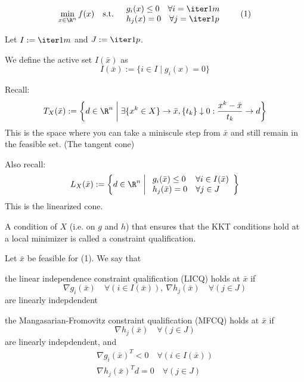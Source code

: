 \label{befc1f5}
\begin{equation}
	\min_{x\in\R^n} f(x)\quad\text{s.t.}\quad\begin{array}{l}
		g_i(x)\leq0 \quad\forall i=\iter1m \\
		h_j(x)=0    \quad\forall j=\iter1p
	\end{array}
	\tag*{(1)}
\end{equation}

Let $I:=\iter1m$ and $J:=\iter1p$.

We define the active set $I(\bar x)$ as
$$
	I(\bar x):=\{i\in I\mid g_i(x) = 0\}
$$

Recall:
$$
	T_X(\bar x):=\left\{
	d\in\R^n \;\middle\vert\; \exists \{x^k\in X\}\to\bar x,\{t_k\}\downarrow0:\frac{x^k-\bar x}{t_k}\to d
	\right\}
$$
This is the space where you can take a miniscule step from $\bar x$
and still remain in the feasible set. (The tangent cone)

Also recall:
$$
	L_X(\bar x):=\left\{
	d\in\R^n
	\;\middle\vert\;
	\begin{array}{l l}
		g_i(\bar x)\leq0 & \forall i\in I(\bar x) \\
		h_j(\bar x)=0    & \forall j\in J
	\end{array}
	\right\}
$$
This is the linearized cone.

\label{e8fa554}

A condition of $X$ (i.e. on $g$ and $h$) that ensures that the KKT
conditions hold at a local minimizer is called a constraint
qualification.

\label{fed784a}

Let $\bar x$ be feasible for (1). We say that

\begin{enumerata}
	\item the linear independence constraint qualification (LICQ) holds
	at $\bar x$ if
	$$
		\nabla g_i(\bar x)\quad\forall(i\in I(\bar x)),\ \nabla h_j(\bar x)\quad\forall(j\in J)
	$$
	are linearly indepdendent
	\item the Mangasarian-Fromovitz constraint qualification (MFCQ)
	holds at $\bar x$ if
	$$
		\nabla h_j(\bar x)\quad\forall(j\in J)
	$$
	are linearly indepdendent, and
	\begin{gather*}
		\nabla g_i(\bar x)^T < 0  \quad\forall(i\in I(\bar x))\\
		\nabla h_j(\bar x)^Td = 0 \quad\forall(j\in J)
	\end{gather*}
\end{enumerata}

